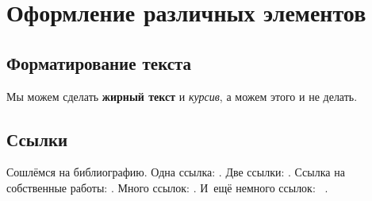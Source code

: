 \chapter{Оформление различных элементов}\label{ch:ch1}

\section{Форматирование текста}\label{sec:ch1/sec1}

Мы можем сделать \textbf{жирный текст} и \textit{курсив}, а можем этого и не делать.

\section{Ссылки}\label{sec:ch1/sec2}

Сошлёмся на библиографию.
Одна ссылка: \cite[с.~54]{Sokolov}\cite[с.~36]{Gaidaenko}.
Две ссылки: \cite{Sokolov,Gaidaenko}.
Ссылка на собственные работы: \cite{vakbib1, confbib2}.
Много ссылок: %
\cite{Lermontov, Management, Borozda, Marketing, Constitution, FamilyCode,
Gost.7.0.53, Razumovski, Lagkueva, Pokrovski, Methodology, Nasirova, Berestova,
Kriger}%
%
.
И~ещё немного ссылок:~\cite{Article,Book,Booklet,Conference,Inbook,Incollection,Manual,Mastersthesis,
Misc,Phdthesis,Proceedings,Techreport,Unpublished}
\cite{medvedev2006jelektronnye, CEAT:CEAT581, doi:10.1080/01932691.2010.513279,
Gosele1999161,Li2007StressAnalysis, Shoji199895, test:eisner-sample,
test:eisner-sample-shorted, AB_patent_Pomerantz_1968, iofis_patent1960}
%
.

%

